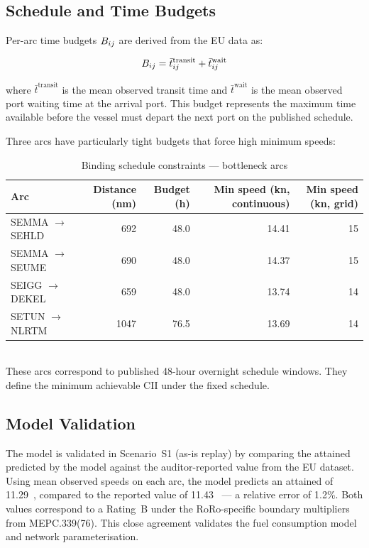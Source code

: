 \subsection{Schedule and Time Budgets}
\label{sec:case:schedule}

Per-arc time budgets $B_{ij}$ are derived from the EU \MRV{} data as:

\begin{equation}
  B_{ij} = \bar{t}^{\mathrm{transit}}_{ij}
            + \bar{t}^{\mathrm{wait}}_{ij}
  \label{eq:budget_def}
\end{equation}

\noindent where $\bar{t}^{\mathrm{transit}}$ is the mean observed transit
time and $\bar{t}^{\mathrm{wait}}$ is the mean observed port waiting time
at the arrival port. This budget represents the maximum time available
before the vessel must depart the next port on the published schedule.

Three arcs have particularly tight budgets that force high minimum speeds:

\begin{table}[h]
\centering
\caption{Binding schedule constraints — bottleneck arcs}
\label{tab:bottleneck_arcs}
\begin{tabular}{lrrrr}
  \toprule
  Arc & {Distance (nm)} & {Budget (h)} & {Min speed (kn, continuous)}
      & {Min speed (kn, grid)} \\
  \midrule
  SEMMA $\to$ SEHLD & 692 & 48.0 & 14.41 & 15 \\
  SEMMA $\to$ SEUME & 690 & 48.0 & 14.37 & 15 \\
  SEIGG $\to$ DEKEL & 659 & 48.0 & 13.74 & 14 \\
  SETUN $\to$ NLRTM & 1047 & 76.5 & 13.69 & 14 \\
  \bottomrule
\end{tabular}
\smallskip\\
{\footnotesize These arcs correspond to published 48-hour overnight
schedule windows. They define the minimum achievable CII under the
fixed schedule.}
\end{table}

\subsection{Model Validation}
\label{sec:case:validation}

The model is validated in Scenario~S1 (as-is replay) by comparing the
attained \CII{} predicted by the model against the auditor-reported
value from the EU \MRV{} dataset. Using mean observed speeds on each arc,
the model predicts an attained \CII{} of 11.29~\gGTnm{}, compared to
the reported value of 11.43~\gGTnm{} --- a relative error of 1.2\%.
Both values correspond to a Rating~B under the RoRo-specific boundary
multipliers from MEPC.339(76). This close agreement validates the
fuel consumption model and network parameterisation.

